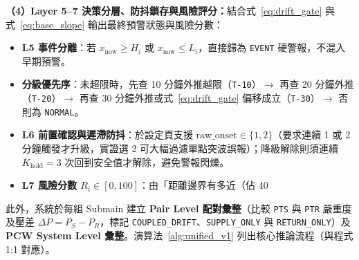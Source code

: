 \documentclass[fontset=none, a4paper, 12pt]{ctexart}
\begin{document}
\begin{doublespace}
\textbf{（4）Layer 5–7 決策分層、防抖鎖存與風險評分：}結合式~\eqref{eq:drift_gate} 與式~\eqref{eq:base_slope} 輸出最終預警狀態與風險分數：
\begin{itemize}
    \item \textbf{L5 事件分離}：若 $x_{\mathrm{now}} \ge H_i$ 或 $x_{\mathrm{now}} \le L_i$，直接歸為 \texttt{EVENT} 硬警報，不混入早期預警。
    \item \textbf{分級優先序}：未超限時，先查 10 分鐘外推越限（\texttt{T-10}）$\to$ 再查 20 分鐘外推（\texttt{T-20}）$\to$ 再查 30 分鐘外推或式~\eqref{eq:drift_gate} 偏移成立（\texttt{T-30}）$\to$ 否則為 \texttt{NORMAL}。
    \item \textbf{L6 前置確認與遲滯防抖}：於設定頁支援 $\text{raw\_onset} \in \{1, 2\}$（要求連續 1 或 2 分鐘觸發才升級，實證選 2 可大幅過濾單點突波誤報）；降級解除則須連續 $K_{\mathrm{hold}}=3$ 次回到安全值才解除，避免警報閃爍。
    \item \textbf{L7 風險分數 $R_i \in [0,100]$}：由「距離邊界有多近（佔 40%
\end{itemize}
此外，系統於每組 Submain 建立 \textbf{Pair Level 配對彙整}（比較 \texttt{PTS} 與 \texttt{PTR} 嚴重度及壓差 $\Delta P = P_S - P_R$，標記 \texttt{COUPLED\_DRIFT}、\texttt{SUPPLY\_ONLY} 與 \texttt{RETURN\_ONLY}）及 \textbf{PCW System Level 彙整}。演算法~\ref{alg:unified_v1} 列出核心推論流程（與程式 1:1 對應）。


\end{doublespace}
\end{document}
